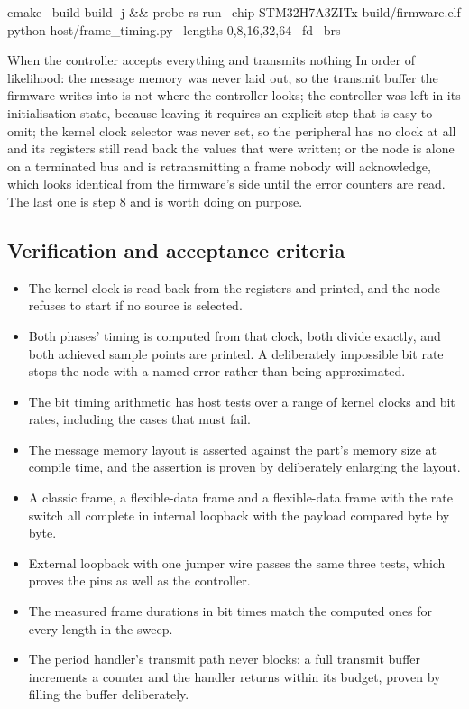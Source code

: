 \begin{shellcode}
cmake --build build -j && probe-rs run --chip STM32H7A3ZITx build/firmware.elf
python host/frame_timing.py --lengths 0,8,16,32,64 --fd --brs
\end{shellcode}

\begin{note}{When the controller accepts everything and transmits nothing}
In order of likelihood: the message memory was never laid out, so the transmit
buffer the firmware writes into is not where the controller looks; the
controller was left in its initialisation state, because leaving it requires an
explicit step that is easy to omit; the kernel clock selector was never set, so
the peripheral has no clock at all and its registers still read back the values
that were written; or the node is alone on a terminated bus and is
retransmitting a frame nobody will acknowledge, which looks identical from the
firmware's side until the error counters are read. The last one is step 8 and is
worth doing on purpose.
\end{note}

\subsection*{Verification and acceptance criteria}

\begin{itemize}
\item The kernel clock is read back from the registers and printed, and the node
refuses to start if no source is selected.
\item Both phases' timing is computed from that clock, both divide exactly, and
both achieved sample points are printed. A deliberately impossible bit rate
stops the node with a named error rather than being approximated.
\item The bit timing arithmetic has host tests over a range of kernel clocks and
bit rates, including the cases that must fail.
\item The message memory layout is asserted against the part's memory size at
compile time, and the assertion is proven by deliberately enlarging the layout.
\item A classic frame, a flexible-data frame and a flexible-data frame with the
rate switch all complete in internal loopback with the payload compared byte by
byte.
\item External loopback with one jumper wire passes the same three tests, which
proves the pins as well as the controller.
\item The measured frame durations in bit times match the computed ones for
every length in the sweep.
\item The period handler's transmit path never blocks: a full transmit buffer
increments a counter and the handler returns within its budget, proven by
filling the buffer deliberately.
\end{itemize}

